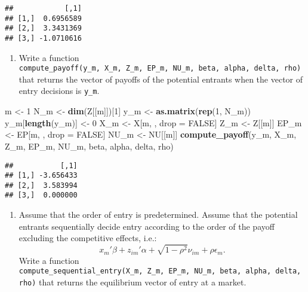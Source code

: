 \documentclass[
]{book}
\newenvironment{Shaded}{\begin{snugshade}}{\end{snugshade}}
\newcommand{\DecValTok}[1]{\textcolor[rgb]{0.00,0.00,0.81}{#1}}
\newcommand{\KeywordTok}[1]{\textcolor[rgb]{0.13,0.29,0.53}{\textbf{#1}}}
\newcommand{\NormalTok}[1]{#1}
\newcommand{\OtherTok}[1]{\textcolor[rgb]{0.56,0.35,0.01}{#1}}
\newcommand{\StringTok}[1]{\textcolor[rgb]{0.31,0.60,0.02}{#1}}
\providecommand{\tightlist}{%
  \setlength{\itemsep}{0pt}\setlength{\parskip}{0pt}}
\begin{document}
\begin{verbatim}
##            [,1]
## [1,]  0.6956589
## [2,]  3.3431369
## [3,] -1.0710616
\end{verbatim}

\begin{enumerate}
\def\labelenumi{\arabic{enumi}.}
\setcounter{enumi}{3}
\tightlist
\item
  Write a function \texttt{compute\_payoff(y\_m,\ X\_m,\ Z\_m,\ EP\_m,\ NU\_m,\ beta,\ alpha,\ delta,\ rho)} that returns the vector of payoffs of the potential entrants when the vector of entry decisions is \texttt{y\_m}.
\end{enumerate}

\begin{Shaded}
\begin{Highlighting}[]
\NormalTok{m <-}\StringTok{ }\DecValTok{1}
\NormalTok{N_m <-}\StringTok{ }\KeywordTok{dim}\NormalTok{(Z[[m]])[}\DecValTok{1}\NormalTok{]}
\NormalTok{y_m <-}\StringTok{ }\KeywordTok{as.matrix}\NormalTok{(}\KeywordTok{rep}\NormalTok{(}\DecValTok{1}\NormalTok{, N_m))}
\NormalTok{y_m[}\KeywordTok{length}\NormalTok{(y_m)] <-}\StringTok{ }\DecValTok{0}
\NormalTok{X_m <-}\StringTok{ }\NormalTok{X[m, , drop =}\StringTok{ }\OtherTok{FALSE}\NormalTok{]}
\NormalTok{Z_m <-}\StringTok{ }\NormalTok{Z[[m]]}
\NormalTok{EP_m <-}\StringTok{ }\NormalTok{EP[m, , drop =}\StringTok{ }\OtherTok{FALSE}\NormalTok{]}
\NormalTok{NU_m <-}\StringTok{ }\NormalTok{NU[[m]]}
\KeywordTok{compute_payoff}\NormalTok{(y_m, X_m, Z_m, EP_m, NU_m, beta, alpha, delta, rho)}
\end{Highlighting}
\end{Shaded}

\begin{verbatim}
##           [,1]
## [1,] -3.656433
## [2,]  3.583994
## [3,]  0.000000
\end{verbatim}

\begin{enumerate}
\def\labelenumi{\arabic{enumi}.}
\setcounter{enumi}{4}
\tightlist
\item
  Assume that the order of entry is predetermined. Assume that the potential entrants sequentially decide entry according to the order of the payoff excluding the competitive effects, i.e.:
  \[
  x_m'\beta + z_{im}'\alpha + \sqrt{1 - \rho^2} \nu_{im} + \rho \epsilon_{m}.
  \]
  Write a function \texttt{compute\_sequential\_entry(X\_m,\ Z\_m,\ EP\_m,\ NU\_m,\ beta,\ alpha,\ delta,\ rho)} that returns the equilibrium vector of entry at a market.
\end{enumerate}
\end{document}
